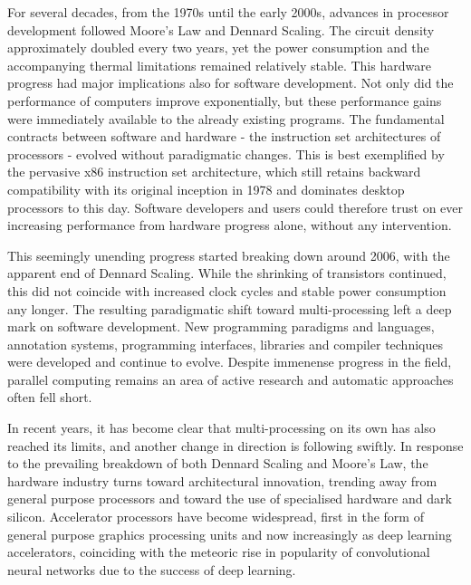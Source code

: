     For several decades, from the 1970s until the early 2000s, advances in
    processor development followed Moore's Law and Dennard Scaling.
    The circuit density approximately doubled every two years, yet the power
    consumption and the accompanying thermal limitations remained relatively
    stable.
    This hardware progress had major implications also for software
    development.
    Not only did the performance of computers improve exponentially, but these
    performance gains were immediately available to the already existing
    programs.
    The fundamental contracts between software and hardware - the
    instruction set architectures of processors - evolved without paradigmatic
    changes.
    This is best exemplified by the pervasive x86 instruction set architecture,
    which still retains backward compatibility with its original inception in
    1978 and dominates desktop processors to this day.
    Software developers and users could therefore trust on ever increasing
    performance from hardware progress alone, without any intervention.

    This seemingly unending progress started breaking down around 2006,
    with the apparent end of Dennard Scaling.
    While the shrinking of transistors continued, this did not coincide with
    increased clock cycles and stable power consumption any longer.
    The resulting paradigmatic shift toward multi-processing left a deep mark on
    software development.
    New programming paradigms and languages, annotation systems, programming
    interfaces, libraries and compiler techniques were developed and continue to
    evolve.
    Despite immenense progress in the field, parallel computing remains an area
    of active research and automatic approaches often fell short.

    In recent years, it has become clear that multi-processing on its own has
    also reached its limits, and another change in direction is following
    swiftly.
    In response to the prevailing breakdown of both Dennard Scaling and Moore's
    Law, the hardware industry turns toward architectural innovation, trending
    away from general purpose processors and toward the use of specialised
    hardware and dark silicon.
    Accelerator processors have become widespread, first in the form of general
    purpose graphics processing units and now increasingly as deep learning
    accelerators, coinciding with the meteoric rise in popularity of
    convolutional neural networks due to the success of deep learning.

